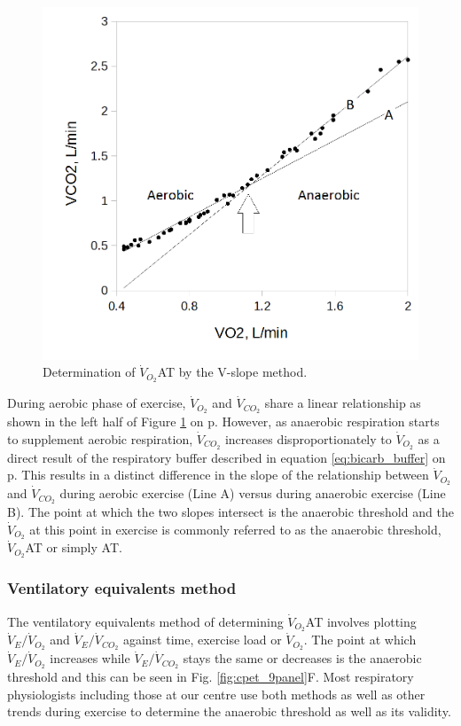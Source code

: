 \begin{figure}[htbp]
	\centering
	\includegraphics[width=\textwidth]{Figures/cpet_vslope}
	\caption{Determination of $\dot{V}_{O_2}$AT by the V-slope method.}
	\label{fig:cpet_vslope}
\end{figure}

During aerobic phase of exercise, $\dot{V}_{O_2}$ and $\dot{V}_{CO_2}$ share a linear relationship as shown in the left half of Figure \ref{fig:cpet_vslope} on p\pageref{fig:cpet_vslope}. 
However, as anaerobic respiration starts to supplement aerobic respiration, $\dot{V}_{CO_2}$ increases disproportionately to $\dot{V}_{O_2}$ as a direct result of the respiratory buffer described in equation \ref{eq:bicarb_buffer} on p\pageref{eq:bicarb_buffer}. 
This results in a distinct difference in the slope of the relationship between $\dot{V}_{O_2}$ and $\dot{V}_{CO_2}$ during aerobic exercise (Line A) versus during anaerobic exercise (Line B). 
The point at which the two slopes intersect is the anaerobic threshold and the $\dot{V}_{O_2}$ at this point in exercise is commonly referred to as the anaerobic threshold, $\dot{V}_{O_2}$AT or simply AT. 

\subsubsection{Ventilatory equivalents method}
The ventilatory equivalents method of determining $\dot{V}_{O_2}$AT involves plotting $\dot{V}_E/\dot{V}_{O_2}$
and $\dot{V}_E/\dot{V}_{CO_2}$ against time, exercise load or $\dot{V}_{O_2}$. 
The point at which $\dot{V}_E/\dot{V}_{O_2}$ increases while $\dot{V}_E/\dot{V}_{CO_2}$ stays the same or decreases is the anaerobic threshold and this can be seen in Fig. \ref{fig:cpet_9panel}F. 
Most respiratory physiologists including those at our centre use both methods as well as other trends during exercise to determine the anaerobic threshold as well as its validity.


